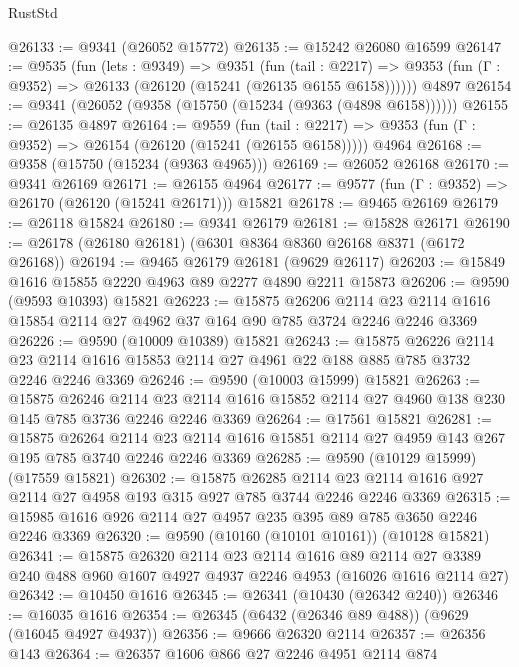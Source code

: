 \begin{lexlean}{RustStd}
\begin{coremodule}
@26133 := @9341 (@26052 @15772)
@26135 := @15242 @26080 @16599
@26147 := @9535
    (fun (lets : @9349) =>
    @9351
      (fun (tail : @2217) =>
      @9353 (fun (Γ : @9352) => @26133 (@26120 (@15241 (@26135 @6155 @6158))))))
    @4897
@26154 := @9341 (@26052 (@9358 (@15750 (@15234 (@9363 (@4898 @6158))))))
@26155 := @26135 @4897
@26164 := @9559
    (fun (tail : @2217) => @9353 (fun (Γ : @9352) => @26154 (@26120 (@15241 (@26155 @6158)))))
    @4964
@26168 := @9358 (@15750 (@15234 (@9363 @4965)))
@26169 := @26052 @26168
@26170 := @9341 @26169
@26171 := @26155 @4964
@26177 := @9577 (fun (Γ : @9352) => @26170 (@26120 (@15241 @26171))) @15821
@26178 := @9465 @26169
@26179 := @26118 @15824
@26180 := @9341 @26179
@26181 := @15828 @26171
@26190 := @26178 (@26180 @26181) (@6301 @8364 @8360 @26168 @8371 (@6172 @26168))
@26194 := @9465 @26179 @26181 (@9629 @26117)
@26203 := @15849 @1616 @15855 @2220 @4963 @89 @2277 @4890 @2211 @15873
@26206 := @9590 (@9593 @10393) @15821
@26223 := @15875
    @26206
    @2114
    @23
    @2114
    @1616
    @15854
    @2114
    @27
    @4962
    @37
    @164
    @90
    @785
    @3724
    @2246
    @2246
    @3369
@26226 := @9590 (@10009 @10389) @15821
@26243 := @15875
    @26226
    @2114
    @23
    @2114
    @1616
    @15853
    @2114
    @27
    @4961
    @22
    @188
    @885
    @785
    @3732
    @2246
    @2246
    @3369
@26246 := @9590 (@10003 @15999) @15821
@26263 := @15875
    @26246
    @2114
    @23
    @2114
    @1616
    @15852
    @2114
    @27
    @4960
    @138
    @230
    @145
    @785
    @3736
    @2246
    @2246
    @3369
@26264 := @17561 @15821
@26281 := @15875
    @26264
    @2114
    @23
    @2114
    @1616
    @15851
    @2114
    @27
    @4959
    @143
    @267
    @195
    @785
    @3740
    @2246
    @2246
    @3369
@26285 := @9590 (@10129 @15999) (@17559 @15821)
@26302 := @15875
    @26285
    @2114
    @23
    @2114
    @1616
    @927
    @2114
    @27
    @4958
    @193
    @315
    @927
    @785
    @3744
    @2246
    @2246
    @3369
@26315 := @15985 @1616 @926 @2114 @27 @4957 @235 @395 @89 @785 @3650 @2246 @2246 @3369
@26320 := @9590 (@10160 (@10101 @10161)) (@10128 @15821)
@26341 := @15875
    @26320
    @2114
    @23
    @2114
    @1616
    @89
    @2114
    @27
    @3389
    @240
    @488
    @960
    @1607
    @4927
    @4937
    @2246
    @4953
    (@16026 @1616 @2114 @27)
@26342 := @10450 @1616
@26345 := @26341 (@10430 (@26342 @240))
@26346 := @16035 @1616
@26354 := @26345 (@6432 (@26346 @89 @488)) (@9629 (@16045 @4927 @4937))
@26356 := @9666 @26320 @2114
@26357 := @26356 @143
@26364 := @26357 @1606 @866 @27 @2246 @4951 @2114 @874

\end{coremodule}
\end{lexlean}
